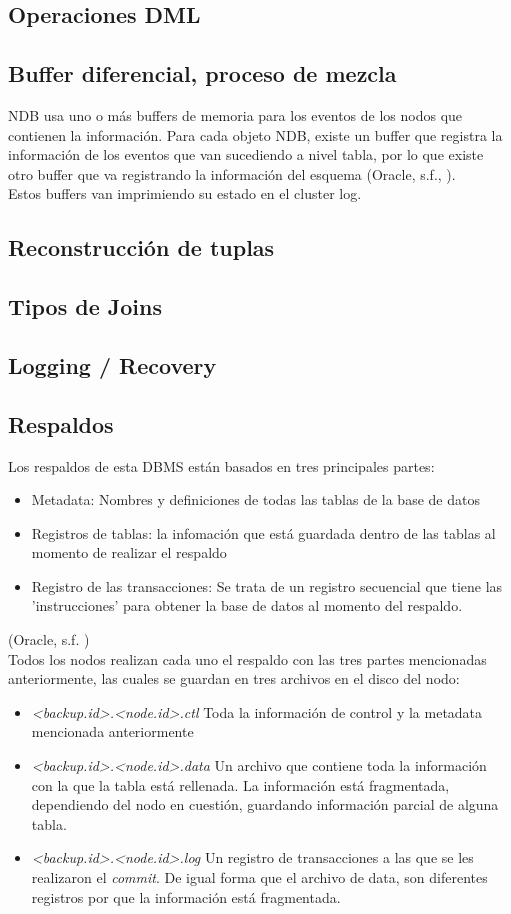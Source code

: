 \documentclass{acmart}
\begin{document}
\subsection{Operaciones DML}

\subsection{Buffer diferencial, proceso de mezcla}
NDB usa uno o más buffers de memoria para los eventos de los nodos que contienen la información. Para cada objeto NDB, existe un buffer que registra la información de los eventos que van sucediendo a nivel tabla, por lo que existe otro buffer que va registrando la información del esquema (Oracle, s.f., \cite{mysqlbuff}).\\
Estos buffers van imprimiendo su estado en el cluster log.
\subsection{Reconstrucción de tuplas}
\subsection{Tipos de Joins}
\subsection{Logging / Recovery}
\subsection{Respaldos}
Los respaldos de esta DBMS están basados en tres principales partes:
\begin{itemize}
    \item Metadata: Nombres y definiciones de todas las tablas de la base de datos
    \item Registros de tablas: la infomación que está guardada dentro de las tablas al momento de realizar el respaldo
    \item Registro de las transacciones: Se trata de un registro secuencial que tiene las 'instrucciones' para obtener la base de datos al momento del respaldo.
\end{itemize}
(Oracle, s.f. \cite{mysqlbackups})\\
Todos los nodos realizan cada uno el respaldo con las tres partes mencionadas anteriormente, las cuales se guardan en tres archivos en el disco del nodo:
\begin{itemize}
    \item \textit{<backup.id>.<node.id>.ctl} Toda la información de control y la metadata mencionada anteriormente
    \item \textit{<backup.id>.<node.id>.data} Un archivo que contiene toda la información con la que la tabla está rellenada. La información está fragmentada, dependiendo del nodo en cuestión, guardando información parcial de alguna tabla.
    \item \textit{<backup.id>.<node.id>.log} Un registro de transacciones a las que se les realizaron el \textit{commit}. De igual forma que el archivo de data, son diferentes registros por que la información está fragmentada.
\end{itemize}
\end{document}
